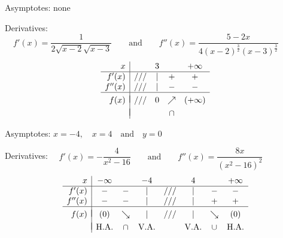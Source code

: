 \begin{Answer}
    
        \Question Asymptotes: \quad none \par
            Derivatives: $\quad f'(x)=\dfrac{1}{2\sqrt{x-2}\sqrt{x-3}}\qquad\mbox{and}\qquad f''(x)=\dfrac{5-2x}{4(x-2)^\frac{3}{2}(x-3)^\frac{3}{2}}$
            \[ \begin{array}{r|cccc}
            x &  & 3 & &+\infty \\
            \hline
            f'(x)   & /// & | & + & + \\
            f''(x)  & /// & | & - & - \\
            \hline
            &&&&\vspace{-0.3cm}\\
            f(x)    & /// & 0 & \nearrow & (+\infty)\\
            &&&&\vspace{-0.3cm}\\                                                                              
                    & &  & \cap & \\
            \end{array}\]
    
    
        \Question Asymptotes: \quad $x=-4,\quad x=4\quad\mbox{and}\quad y=0$\par
            Derivatives: $\quad f'(x)=-\dfrac{4}{x^2-16}\qquad\mbox{and}\qquad f''(x)=\dfrac{8x}{(x^2-16)^2}$
            \[ \begin{array}{r|ccccccc}
            x & -\infty  &  & -4 &  & 4 & &+\infty \\
            \hline
            f'(x)   & - & - & | & /// & | & - & - \\
            f''(x)  & - & - & | & /// & | & + & + \\
            \hline
            &&&&&&&\vspace{-0.3cm}\\
            f(x)    & (0) & \searrow & | & ///& | & \searrow & (0)\\
            &&&&&&&\vspace{-0.3cm}\\                                                                              
                    & \mbox{H.A.} & \cap & \mbox{V.A.} & & \mbox{V.A.} & \cup & \mbox{H.A.} \\
            \end{array}\]
        \fi
   
\end{Answer}


\ifcalculus
